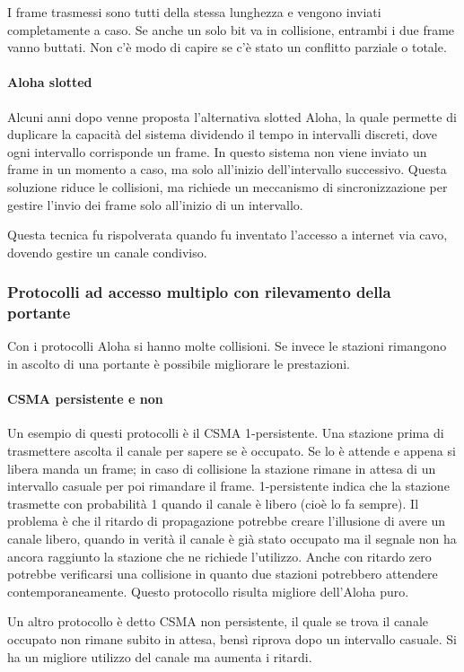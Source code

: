 I frame trasmessi sono tutti della stessa lunghezza e vengono inviati completamente a caso. 
Se anche un solo bit va in collisione, entrambi i due frame vanno buttati.
Non c'è modo di capire se c'è stato un conflitto parziale o totale.

\paragraph{Aloha slotted}
Alcuni anni dopo venne proposta l'alternativa slotted Aloha,
la quale permette di duplicare la capacità del sistema dividendo il tempo in intervalli discreti, dove ogni intervallo corrisponde un frame.
In questo sistema non viene inviato un frame in un momento a caso, ma solo all'inizio dell'intervallo successivo.
Questa soluzione riduce le collisioni, ma richiede un meccanismo di sincronizzazione per gestire l'invio dei frame solo all'inizio di un intervallo.

Questa tecnica fu rispolverata quando fu inventato l'accesso a internet via cavo, dovendo gestire un canale condiviso.

\subsubsection{Protocolli ad accesso multiplo con rilevamento della portante}
Con i protocolli Aloha si hanno molte collisioni.
Se invece le stazioni rimangono in ascolto di una portante è possibile migliorare le prestazioni.

\paragraph{CSMA persistente e non}
Un esempio di questi protocolli è il CSMA 1-persistente.
Una stazione prima di trasmettere ascolta il canale per sapere se è occupato.
Se lo è attende e appena si libera manda un frame;
in caso di collisione la stazione rimane in attesa di un intervallo casuale per poi rimandare il frame.
1-persistente indica che la stazione trasmette con probabilità 1 quando il canale è libero (cioè lo fa sempre).
Il problema è che il ritardo di propagazione potrebbe creare l'illusione di avere un canale libero,
quando in verità il canale è già stato occupato ma il segnale non ha ancora raggiunto la stazione che ne richiede l'utilizzo.
Anche con ritardo zero potrebbe verificarsi una collisione in quanto due stazioni potrebbero attendere contemporaneamente.
Questo protocollo risulta migliore dell'Aloha puro.

Un altro protocollo è detto CSMA non persistente, il quale se trova il canale occupato non rimane subito in attesa, bensì riprova dopo un intervallo casuale.
Si ha un migliore utilizzo del canale ma aumenta i ritardi.


